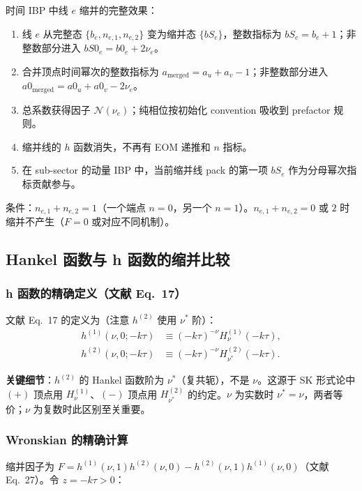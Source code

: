 ﻿\documentclass[a4paper,11pt]{article}
\begin{document}
时间 IBP 中线 $e$ 缩并的完整效果：

\begin{enumerate}
  \item 线 $e$ 从完整态 $\{b_e, n_{e,1}, n_{e,2}\}$ 变为缩并态 $\{bS_e\}$，整数指标为 $bS_e=b_e+1$；非整数部分进入 $bS0_e=b0_e+2\nu_e$。
  \item 合并顶点时间幂次的整数指标为 $a_{\text{merged}} = a_u + a_v - 1$；非整数部分进入 $a0_{\text{merged}}=a0_u+a0_v-2\nu_e$。
  \item 总系数获得因子 $\mathcal{N}(\nu_e)$；纯相位按初始化 convention 吸收到 prefactor 规则。
  \item 缩并线的 $h$ 函数消失，不再有 EOM 递推和 $n$ 指标。
  \item 在 sub-sector 的动量 IBP 中，当前缩并线 pack 的第一项 $bS_e$ 作为分母幂次指标贡献参与。
\end{enumerate}

条件：$n_{e,1} + n_{e,2} = 1$（一个端点 $n=0$，另一个 $n=1$）。$n_{e,1} + n_{e,2} = 0$ 或 $2$ 时缩并不产生（$F = 0$ 或对应不同机制）。

\subsection{Hankel 函数与 h 函数的缩并比较}

\subsubsection{h 函数的精确定义（文献 Eq.~17）}

文献 Eq.~17 的定义为（注意 $h^{(2)}$ 使用 $\nu^*$ 阶）：
\begin{align}
  h^{(1)}(\nu, 0; -k\tau) &\equiv (-k\tau)^{-\nu} H_\nu^{(1)}(-k\tau), \\
  h^{(2)}(\nu, 0; -k\tau) &\equiv (-k\tau)^{-\nu} H_{\nu^*}^{(2)}(-k\tau).
  \label{hdef_explicit}
\end{align}

\textbf{关键细节}：$h^{(2)}$ 的 Hankel 函数阶为 $\nu^*$（复共轭），不是 $\nu$。这源于 SK 形式论中 $(+)$ 顶点用 $H_\nu^{(1)}$、$(-)$ 顶点用 $H_{\nu^*}^{(2)}$ 的约定。$\nu$ 为实数时 $\nu^*=\nu$，两者等价；$\nu$ 为复数时此区别至关重要。

\subsubsection{Wronskian 的精确计算}

缩并因子为 $F = h^{(1)}(\nu,1) h^{(2)}(\nu,0) - h^{(2)}(\nu,1) h^{(1)}(\nu,0)$（文献 Eq.~27）。令 $z = -k\tau > 0$：
\end{document}
